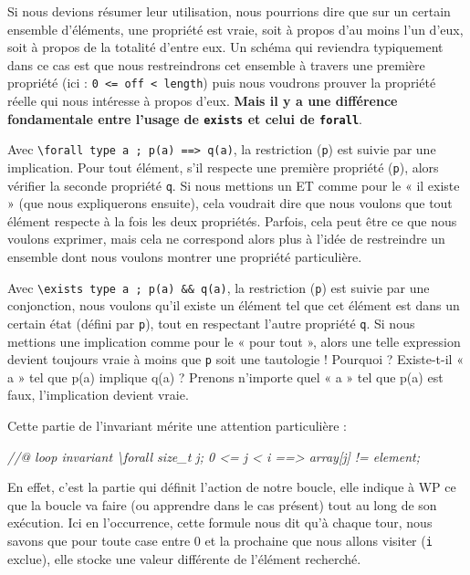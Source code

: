 \documentclass[12pt,francais,]{scrbook}
\newenvironment{Shaded}{}{}
\newcommand{\CommentTok}[1]{\textcolor[rgb]{0.38,0.63,0.69}{\textit{{#1}}}}
\begin{document}
Si nous devions résumer leur utilisation, nous pourrions dire que sur un
certain ensemble d'éléments, une propriété est vraie, soit à propos d'au
moins l'un d'eux, soit à propos de la totalité d'entre eux. Un schéma
qui reviendra typiquement dans ce cas est que nous restreindrons cet
ensemble à travers une première propriété (ici :
\texttt{0\ \textless{}=\ off\ \textless{}\ length}) puis nous voudrons
prouver la propriété réelle qui nous intéresse à propos d'eux.
\textbf{Mais il y a une différence fondamentale entre l'usage de
\texttt{exists} et celui de \texttt{forall}}.

Avec
\texttt{\textbackslash{}forall\ type\ a\ ;\ p(a)\ ==\textgreater{}\ q(a)},
la restriction (\texttt{p}) est suivie par une implication. Pour tout
élément, s'il respecte une première propriété (\texttt{p}), alors
vérifier la seconde propriété \texttt{q}. Si nous mettions un ET comme
pour le « il existe » (que nous expliquerons ensuite), cela voudrait
dire que nous voulons que tout élément respecte à la fois les deux
propriétés. Parfois, cela peut être ce que nous voulons exprimer, mais
cela ne correspond alors plus à l'idée de restreindre un ensemble dont
nous voulons montrer une propriété particulière.

Avec \texttt{\textbackslash{}exists\ type\ a\ ;\ p(a)\ \&\&\ q(a)}, la
restriction (\texttt{p}) est suivie par une conjonction, nous voulons
qu'il existe un élément tel que cet élément est dans un certain état
(défini par \texttt{p}), tout en respectant l'autre propriété
\texttt{q}. Si nous mettions une implication comme pour le « pour tout
», alors une telle expression devient toujours vraie à moins que
\texttt{p} soit une tautologie ! Pourquoi ? Existe-t-il « a » tel que
p(a) implique q(a) ? Prenons n'importe quel « a » tel que p(a) est faux,
l'implication devient vraie.

Cette partie de l'invariant mérite une attention particulière :

\begin{footnotesize}\begin{Shaded}
\begin{Highlighting}[]
\CommentTok{//@ loop invariant \textbackslash{}forall size_t j; 0 <= j < i ==> array[j] != element;}
\end{Highlighting}
\end{Shaded}\end{footnotesize}

En effet, c'est la partie qui définit l'action de notre boucle, elle
indique à WP ce que la boucle va faire (ou apprendre dans le cas
présent) tout au long de son exécution. Ici en l'occurrence, cette
formule nous dit qu'à chaque tour, nous savons que pour toute case entre
0 et la prochaine que nous allons visiter (\texttt{i} exclue), elle
stocke une valeur différente de l'élément recherché.
\end{document}
